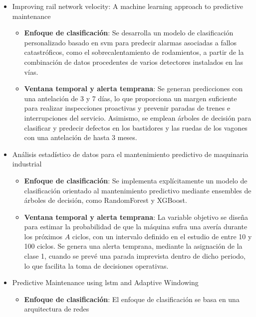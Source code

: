 \documentclass[IB]{TFUOC}
\begin{document}
\begin{itemize}
  \item Improving rail network velocity: A machine learning approach to predictive maintenance \cite{li2014improving}
        \begin{itemize}
          \item \textbf{Enfoque de clasificación}: Se desarrolla un modelo de clasificación personalizado basado en
                \gls{svm} para predecir alarmas asociadas a fallos catastróficos, como el sobrecalentamiento de
                rodamientos, a partir de la combinación de datos procedentes de varios detectores instalados en las vías.
          \item \textbf{Ventana temporal y alerta temprana}: Se generan predicciones con una antelación de 3 y 7 días,
                lo que proporciona un margen suficiente para realizar inspecciones proactivas y prevenir paradas de
                trenes e interrupciones del servicio. Asimismo, se emplean árboles de decisión para clasificar y
                predecir defectos en los bastidores y las ruedas de los vagones con una antelación de hasta 3 meses.
        \end{itemize}
  \item Análisis estadístico de datos para el mantenimiento predictivo de maquinaria industrial \cite{brasa2019analisis}
        \begin{itemize}
          \item \textbf{Enfoque de clasificación}: Se implementa explícitamente un modelo de clasificación orientado al
                mantenimiento predictivo mediante ensembles de árboles de decisión, como \gls{RandomForest} y \gls{XGBoost}.
          \item \textbf{Ventana temporal y alerta temprana}: La variable objetivo se diseña para estimar la probabilidad
                de que la máquina sufra una avería durante los próximos $A$ ciclos, con un intervalo definido en el
                estudio de entre 10 y 100 ciclos. Se genera una alerta temprana, mediante la asignación de la clase 1,
                cuando se prevé una parada imprevista dentro de dicho periodo, lo que facilita la toma de decisiones
                operativas.
        \end{itemize}
  \item Predictive Maintenance using \gls{lstm} and Adaptive Windowing \cite{adivi2024predictive}
        \begin{itemize}
          \item \textbf{Enfoque de clasificación}: El enfoque de clasificación se basa en una arquitectura de redes

\end{itemize}
\end{itemize}
\end{document}

